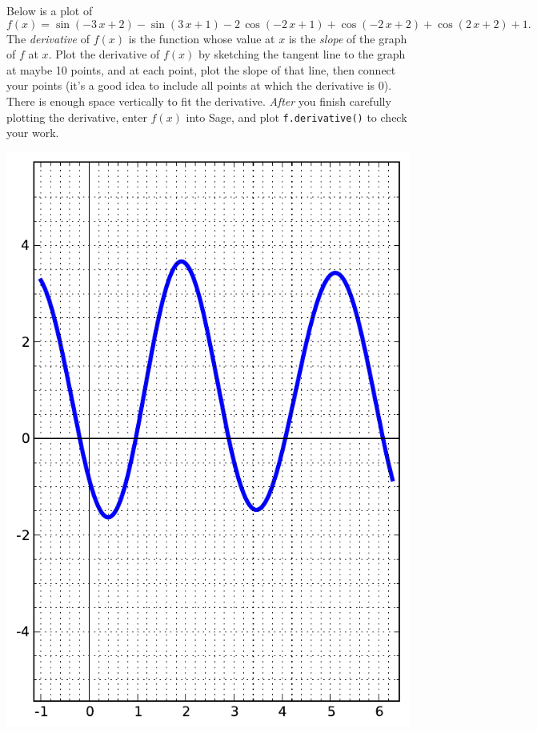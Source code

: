 Below is a plot of $$f(x)=\sin\left(-3 \, x + 2\right) - \sin\left(3 \, x + 1\right) - 2 \, \cos\left(-2 \, x + 1\right) + \cos\left(-2 \, x + 2\right) + \cos\left(2 \, x + 2\right) + 1.$$  The {\em \color{red}derivative} of $f(x)$ is the function whose value at $x$ is the {\em slope} of the graph of $f$ at $x$.  Plot the derivative of $f(x)$ by sketching the tangent line to the graph at maybe 10 points, and at each point, plot the slope of that line, then connect your points (it's a good idea to include all points at which the derivative is 0).  There is enough space vertically to fit the derivative.  {\em After} you finish carefully plotting the derivative, enter $f(x)$ into Sage, and plot {\color{blue}\verb|f.derivative()|} to check your work.
\begin{center}\includegraphics{functions/49.pdf}\end{center}\newpage

